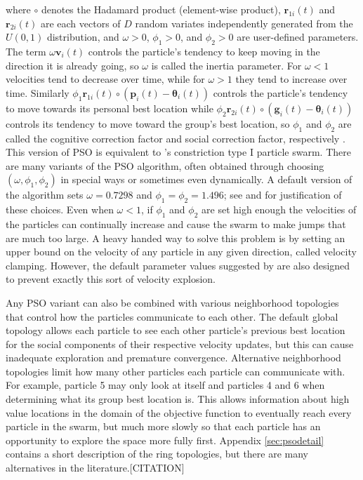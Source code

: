 \documentclass[12pt]{article}
\begin{document}
where $\circ$ denotes the Hadamard product (element-wise product), $\bm{r}_{1i}(t)$ and $\bm{r}_{2i}(t)$ are each vectors of $D$ random variates independently generated from the $U(0,1)$ distribution, and $\omega>0$, $\phi_1>0$, and $\phi_2>0$ are user-defined parameters. The term $\omega \bm{v}_i(t)$ controls the particle's tendency to keep moving in the direction it is already going, so $\omega$ is called the inertia parameter. For $\omega<1$ velocities tend to decrease over time, while for $\omega>1$ they tend to increase over time. Similarly $\phi_1 \bm{r}_{1i}(t)\circ(\bm{p}_i(t) - \bm{\theta}_i(t))$ controls the particle's tendency to move towards its personal best location while $\phi_2 \bm{r}_{2i}(t)\circ(\bm{g}_i(t) - \bm{\theta}_i(t))$ controls its tendency to move toward the group's best location, so $\phi_1$ and $\phi_2$ are called the cognitive correction factor and social correction factor, respectively \citep{blum2008swarm}. This version of PSO is equivalent to \citet{clerc2002particle}'s constriction type I particle swarm. There are many variants of the PSO algorithm, often obtained through choosing $(\omega,\phi_1,\phi_2)$ in special ways or sometimes even dynamically. A default version of the algorithm sets $\omega = 0.7298$ and $\phi_1 = \phi_2 = 1.496$; see \citet{clerc2002particle} and \citet{blum2008swarm} for justification of these choices. Even when $\omega<1$, if $\phi_1$ and $\phi_2$ are set high enough the velocities of the particles can continually increase and cause the swarm to make jumps that are much too large. A heavy handed way to solve this problem is by setting an upper bound on the velocity of any particle in any given direction, called velocity clamping. However, the default parameter values suggested by \citet{clerc2002particle} are also designed to prevent exactly this sort of velocity explosion.

Any PSO variant can also be combined with various neighborhood topologies that control how the particles communicate to each other. The default global topology allows each particle to see each other particle's previous best location for the social components of their respective velocity updates, but this can cause inadequate exploration and premature convergence. Alternative neighborhood topologies limit how many other particles each particle can communicate with. For example, particle 5 may only look at itself and particles 4 and 6 when determining what its group best location is. This allows information about high value locations in the domain of the objective function to eventually reach every particle in the swarm, but much more slowly so that each particle has an opportunity to explore the space more fully first. Appendix \ref{sec:psodetail} contains a short description of the ring topologies, but there are many alternatives in the literature.[CITATION]
\end{document}
